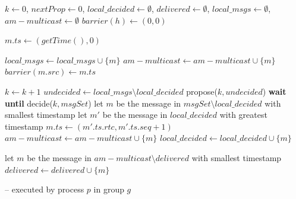 \documentclass[times, 10pt]{article}
\begin{document}
\begin{algorithm}
\begin{distribalgo}[1]

\blankline
{}
  \STATE $k \leftarrow 0$, $nextProp \leftarrow 0$, $local\_decided \leftarrow \emptyset$, $delivered \leftarrow \emptyset$, $local\_msgs \leftarrow \emptyset$, $am-multicast \leftarrow \emptyset$
    \STATE $barrier(h) \leftarrow (0,0)$ 
  \ENDINDENT
\ENDINDENT 

\blankline
{}
  \STATE $m.ts \leftarrow (getTime(),0)$
  \STATE {} \label{algline:rmlocal}
\ENDINDENT

\blankline
{}
    \STATE $local\_msgs \leftarrow local\_msgs \cup \{m\}$ \label{algline:addtogroupmsgs}
    \STATE $am-multicast \leftarrow am-multicast \cup \{m\}$ \label{algline:insbp1}
    \STATE $barrier(m.src) \leftarrow m.ts$ \label{algline:incbar}
  \ENDIF
\ENDWHEN

\blankline
{}
  \STATE $k \leftarrow k + 1$
	\STATE $undecided \leftarrow local\_msgs \setminus local\_decided$
	\STATE propose($k, undecided$) \label{algline:propose}
	\STATE \textbf{wait until} decide($k, msgSet$)
		\STATE let $m$ be the message in $msgSet \setminus local\_decided$ with smallest timestamp
		\STATE let $m'$ be the message in $local\_decided$ with greatest timestamp
			\STATE $m.ts \leftarrow (m'.ts.rtc, m'.ts.seq + 1)$
		\ENDIF     
		 \label{algline:checkcons}
			\STATE $am-multicast \leftarrow am-multicast \cup \{m\}$  \label{algline:insbp2}
		\ENDIF
		\STATE $local\_decided \leftarrow local\_decided \cup \{m\}$  \label{algline:addtodecided}
		\STATE {} \label{algline:rmothers}
	\ENDWHILE

\ENDWHEN

\blankline
 \label{algline:inam-multicast}
	\STATE let $m$ be the message in $am-multicast \setminus delivered$ with smallest timestamp
		  \STATE {} \label{algline:consdeliver}
		\ENDIF
		\STATE $delivered \leftarrow delivered \cup \{m\}$ \label{algline:addtodelivered}
	\ENDIF
\ENDWHEN
\blankline

\caption{ -- executed by process $p$ in group $g$}
\label{algorithm:deliveryminimal}
\end{distribalgo}
\end{algorithm}
\end{document}
